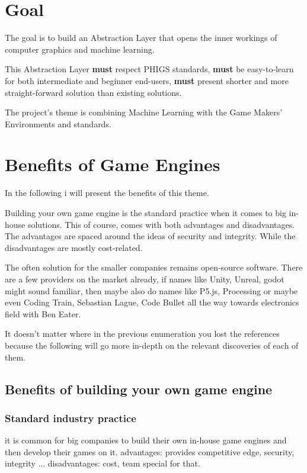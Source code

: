   \chapter*{Goal}

    The goal is to build an Abstraction Layer that opens the inner workings of computer graphics and machine learning.

    This Abstraction Layer \textbf{must} respect PHIGS standards, \textbf{must} be easy-to-learn for both intermediate and beginner end-users, \textbf{must} present shorter and more straight-forward solution than existing solutions.

    The project's theme is combining Machine Learning with the Game Makers' Environments and standards.

    \chapter*{Benefits of Game Engines}
      In the following i will present the benefits of this theme.

      Building your own game engine is the standard practice when it comes to big in-house solutions. 
      This of course, comes with both advantages and disadvantages.
      The advantages are spaced around the ideas of security and integrity.
      While the disadvantages are mostly cost-related.

      The often solution for the smaller companies remains open-source software.
      There are a few providers on the market already, if names like Unity, Unreal, godot might sound familiar, then maybe also do names like P5.js, Processing or maybe even Coding Train, Sebastian Lague, Code Bullet all the way towards electronics field with Ben Eater. 

      It doesn't matter where in the previous enumeration you lost the references because the following will go more in-depth on the relevant discoveries of each of them.


      \section*{Benefits of building your own game engine}
          \subsection*{Standard industry practice}
              it is common for big companies to build their own in-house game engines and then develop their games on it.
              advantages:     provides competitive edge, security, integrity ...
              disadvantages:  cost, team special for that.

